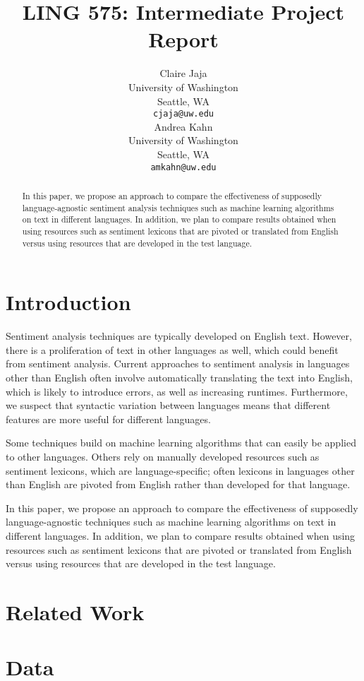 \documentclass[11pt]{article}
\title{LING 575: Intermediate Project Report}
\author{Claire Jaja \\
  University of Washington \\
  Seattle, WA \\
  {\tt cjaja@uw.edu} \\\And
  Andrea Kahn \\
  University of Washington \\
  Seattle, WA \\
  {\tt amkahn@uw.edu} \\}
\date{}
\begin{document}
\maketitle
\begin{abstract}
In this paper, we propose an approach to compare the effectiveness of supposedly language-agnostic sentiment analysis techniques such as machine learning algorithms on text in different languages. In addition, we plan to compare results obtained when using resources such as sentiment lexicons that are pivoted or translated from English versus using resources that are developed in the test language.
\end{abstract}

\section{Introduction}

Sentiment analysis techniques are typically developed on English text.  However, there is a proliferation of text in other languages as well, which could benefit from sentiment analysis.  Current approaches to sentiment analysis in languages other than English often involve automatically translating the text into English, which is likely to introduce errors, as well as increasing runtimes.  Furthermore, we suspect that syntactic variation between languages means that different features are more useful for different languages.

Some techniques build on machine learning algorithms that can easily be applied to other languages.  Others rely on manually developed resources such as sentiment lexicons, which are language-specific; often lexicons in languages other than English are pivoted from English rather than developed for that language.

In this paper, we propose an approach to compare the effectiveness of supposedly language-agnostic techniques such as machine learning algorithms on text in different languages. In addition, we plan to compare results obtained when using resources such as sentiment lexicons that are pivoted or translated from English versus using resources that are developed in the test language.

\section{Related Work}


\section{Data}
\end{document}
